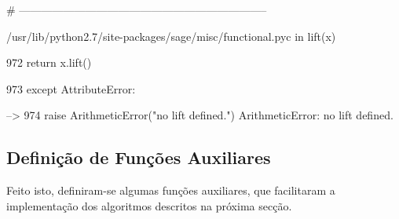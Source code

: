\documentclass[11pt]{article}
\begin{document}
\# --------------------------------------------------------------------

/usr/lib/python2.7/site-packages/sage/misc/functional.pyc in lift(x)
    
    972         return x.lift()
    
    973         except AttributeError:

    --> 974         raise ArithmeticError("no lift defined.")
ArithmeticError: no lift defined.
    \hypertarget{definiuxe7uxe3o-de-funuxe7uxf5es-auxiliares}{%
\subsection{Definição de Funções
Auxiliares}\label{definiuxe7uxe3o-de-funuxe7uxf5es-auxiliares}}

Feito isto, definiram-se algumas funções auxiliares, que facilitaram a
implementação dos algoritmos descritos na próxima secção.
\end{document}
